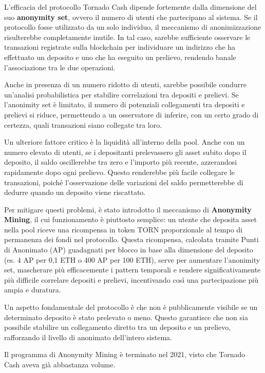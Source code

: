 L’efficacia del protocollo Tornado Cash dipende fortemente dalla dimensione del suo \textbf{anonymity set}, ovvero il numero di utenti che partecipano al sistema. Se il protocollo fosse utilizzato da un solo individuo, il meccanismo di anonimizzazione risulterebbe completamente inutile. In tal caso, sarebbe sufficiente osservare le transazioni registrate sulla blockchain per individuare un indirizzo che ha effettuato un deposito e uno che ha eseguito un prelievo, rendendo banale l’associazione tra le due operazioni.

Anche in presenza di un numero ridotto di utenti, sarebbe possibile condurre un’analisi probabilistica per stabilire correlazioni tra depositi e prelievi. Se l’anonimity set è limitato, il numero di potenziali collegamenti tra depositi e prelievi si riduce, permettendo a un osservatore di inferire, con un certo grado di certezza, quali transazioni siano collegate tra loro.

Un ulteriore fattore critico è la liquidità all’interno della pool. Anche con un numero elevato di utenti, se i depositanti prelevassero gli asset subito dopo il deposito, il saldo oscillerebbe tra zero e l’importo più recente, azzerandosi rapidamente dopo ogni prelievo. Questo renderebbe più facile collegare le transazioni, poiché l’osservazione delle variazioni del saldo permetterebbe di dedurre quando un deposito viene riscattato.

Per mitigare questi problemi, è stato introdotto il meccanismo di \textbf{Anonymity Mining}, il cui funzionamento è piuttosto semplice: un utente che deposita asset nella pool riceve una ricompensa in token TORN proporzionale al tempo di permanenza dei fondi nel protocollo. Questa ricompensa, calcolata tramite Punti di Anonimato (AP) guadagnati per blocco in base alla dimensione del deposito (es. 4 AP per 0,1 ETH o 400 AP per 100 ETH), serve per aumentare l’anonimity set, mascherare più efficacemente i pattern temporali e rendere significativamente più difficile correlare depositi e prelievi, incentivando così una partecipazione più ampia e duratura.

Un aspetto fondamentale del protocollo è che non è pubblicamente visibile se un determinato deposito è stato prelevato o meno. Questo garantisce che non sia possibile stabilire un collegamento diretto tra un deposito e un prelievo, rafforzando il livello di anonimato dell’intero sistema.

Il programma di Anonymity Mining è terminato nel 2021, visto che Tornado Cash aveva già abbastanza volume.

